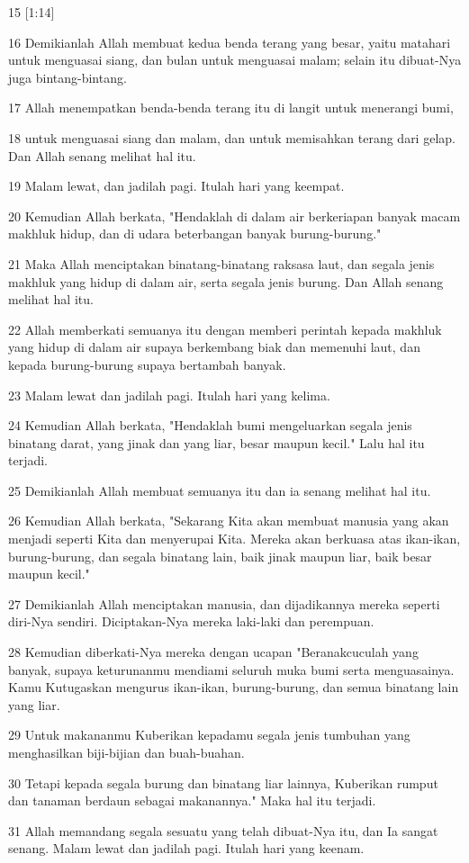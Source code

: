 \par 15 [1:14]
\par 16 Demikianlah Allah membuat kedua benda terang yang besar, yaitu matahari untuk menguasai siang, dan bulan untuk menguasai malam; selain itu dibuat-Nya juga bintang-bintang.
\par 17 Allah menempatkan benda-benda terang itu di langit untuk menerangi bumi,
\par 18 untuk menguasai siang dan malam, dan untuk memisahkan terang dari gelap. Dan Allah senang melihat hal itu.
\par 19 Malam lewat, dan jadilah pagi. Itulah hari yang keempat.
\par 20 Kemudian Allah berkata, "Hendaklah di dalam air berkeriapan banyak macam makhluk hidup, dan di udara beterbangan banyak burung-burung."
\par 21 Maka Allah menciptakan binatang-binatang raksasa laut, dan segala jenis makhluk yang hidup di dalam air, serta segala jenis burung. Dan Allah senang melihat hal itu.
\par 22 Allah memberkati semuanya itu dengan memberi perintah kepada makhluk yang hidup di dalam air supaya berkembang biak dan memenuhi laut, dan kepada burung-burung supaya bertambah banyak.
\par 23 Malam lewat dan jadilah pagi. Itulah hari yang kelima.
\par 24 Kemudian Allah berkata, "Hendaklah bumi mengeluarkan segala jenis binatang darat, yang jinak dan yang liar, besar maupun kecil." Lalu hal itu terjadi.
\par 25 Demikianlah Allah membuat semuanya itu dan ia senang melihat hal itu.
\par 26 Kemudian Allah berkata, "Sekarang Kita akan membuat manusia yang akan menjadi seperti Kita dan menyerupai Kita. Mereka akan berkuasa atas ikan-ikan, burung-burung, dan segala binatang lain, baik jinak maupun liar, baik besar maupun kecil."
\par 27 Demikianlah Allah menciptakan manusia, dan dijadikannya mereka seperti diri-Nya sendiri. Diciptakan-Nya mereka laki-laki dan perempuan.
\par 28 Kemudian diberkati-Nya mereka dengan ucapan "Beranakcuculah yang banyak, supaya keturunanmu mendiami seluruh muka bumi serta menguasainya. Kamu Kutugaskan mengurus ikan-ikan, burung-burung, dan semua binatang lain yang liar.
\par 29 Untuk makananmu Kuberikan kepadamu segala jenis tumbuhan yang menghasilkan biji-bijian dan buah-buahan.
\par 30 Tetapi kepada segala burung dan binatang liar lainnya, Kuberikan rumput dan tanaman berdaun sebagai makanannya." Maka hal itu terjadi.
\par 31 Allah memandang segala sesuatu yang telah dibuat-Nya itu, dan Ia sangat senang. Malam lewat dan jadilah pagi. Itulah hari yang keenam.

